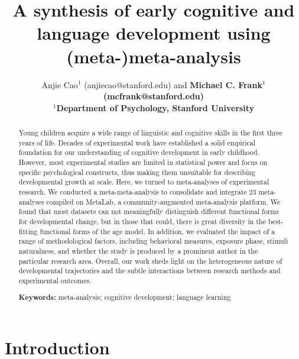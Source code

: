 \documentclass[10pt, letterpaper]{article}
\title{A synthesis of early cognitive and language development using
(meta-)meta-analysis}
\author{Anjie Cao$^1$  (anjiecao@stanford.edu)
 and \bf{Michael C. Frank$^1$ (mcfrank@stanford.edu)} \\
$^1$Department of Psychology, Stanford University }
\begin{document}
\maketitle

\begin{abstract}
Young children acquire a wide range of linguistic and cognitive skills
in the first three years of life. Decades of experimental work have
established a solid empirical foundation for our understanding of
cognitive development in early childhood. However, most experimental
studies are limited in statistical power and focus on specific
psychological constructs, thus making them unsuitable for describing
developmental growth at scale. Here, we turned to meta-analyses of
experimental research. We conducted a meta-meta-analysis to consolidate
and integrate 23 meta-analyses compiled on MetaLab, a
community-augmented meta-analysis platform. We found that most datasets
can not meaningfully distinguish different functional forms for
developmental change, but in those that could, there is great diversity
in the best-fitting functional forms of the age model. In addition, we
evaluated the impact of a range of methodological factors, including
behavioral measures, exposure phase, stimuli naturalness, and whether
the study is produced by a prominent author in the particular research
area. Overall, our work sheds light on the heterogeneous nature of
developmental trajectories and the subtle interactions between research
methods and experimental outcomes.

\textbf{Keywords:}
meta-analysis; cognitive development; language learning
\end{abstract}

\hypertarget{introduction}{%
\section{Introduction}\label{introduction}}
\end{document}

